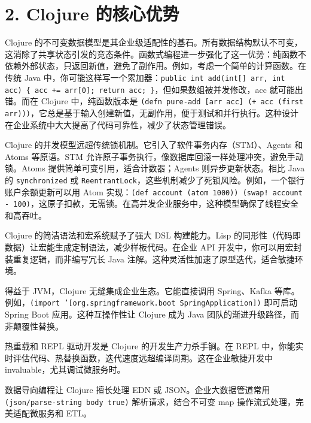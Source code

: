 \chapter{2. Clojure 的核心优势}
Clojure 的不可变数据模型是其企业级适配性的基石。所有数据结构默认不可变，这消除了共享状态引发的竞态条件。函数式编程进一步强化了这一优势：纯函数不依赖外部状态，只返回新值，避免了副作用。例如，考虑一个简单的计算函数。在传统 Java 中，你可能这样写一个累加器：\texttt{public int add(int[] arr, int acc) \{{} acc += arr[0]; return acc; \}{}}，但如果数组被并发修改，acc 就可能出错。而在 Clojure 中，纯函数版本是 \texttt{(defn pure-add [arr acc] (+ acc (first arr)))}，它总是基于输入创建新值，无副作用，便于测试和并行执行。这种设计在企业系统中大大提高了代码可靠性，减少了状态管理错误。\par
Clojure 的并发模型远超传统锁机制。它引入了软件事务内存（STM）、Agents 和 Atoms 等原语。STM 允许原子事务执行，像数据库回滚一样处理冲突，避免手动锁。Atoms 提供简单可变引用，适合计数器；Agents 则异步更新状态。相比 Java 的 \texttt{synchronized} 或 \texttt{ReentrantLock}，这些机制减少了死锁风险。例如，一个银行账户余额更新可以用 Atom 实现：\texttt{(def account (atom 1000)) (swap! account - 100)}，这原子扣款，无需锁。在高并发企业服务中，这种模型确保了线程安全和高吞吐。\par
Clojure 的简洁语法和宏系统赋予了强大 DSL 构建能力。Lisp 的同形性（代码即数据）让宏能生成定制语法，减少样板代码。在企业 API 开发中，你可以用宏封装重复逻辑，而非编写冗长 Java 注解。这种灵活性加速了原型迭代，适合敏捷环境。\par
得益于 JVM，Clojure 无缝集成企业生态。它能直接调用 Spring、Kafka 等库。例如，\texttt{(import '[org.springframework.boot SpringApplication])} 即可启动 Spring Boot 应用。这种互操作性让 Clojure 成为 Java 团队的渐进升级路径，而非颠覆性替换。\par
热重载和 REPL 驱动开发是 Clojure 的开发生产力杀手锏。在 REPL 中，你能实时评估代码、热替换函数，迭代速度远超编译周期。这在企业敏捷开发中 invaluable，尤其调试微服务时。\par
数据导向编程让 Clojure 擅长处理 EDN 或 JSON。企业大数据管道常用 \texttt{(json/parse-string body true)} 解析请求，结合不可变 map 操作流式处理，完美适配微服务和 ETL。\par
